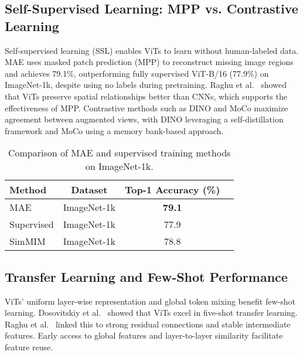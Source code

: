 \documentclass[conference]{IEEEtran}
\begin{document}
\subsection{Self-Supervised Learning: MPP vs. Contrastive Learning}

Self-supervised learning (SSL) enables ViTs to learn without human-labeled data. MAE \cite{he2022masked} uses masked patch prediction (MPP) to reconstruct missing image regions and achieves 79.1\%, outperforming fully supervised ViT-B/16 (77.9\%) on ImageNet-1k, despite using no labels during pretraining. Raghu et al.~\cite{raghu2021vision} showed that ViTs preserve spatial relationships better than CNNs, which supports the effectiveness of MPP. Contrastive methods such as DINO and MoCo \cite{caron2021emerging, chen2021empirical} maximize agreement between augmented views, with DINO leveraging a self-distillation framework and MoCo using a memory bank-based approach.

\begin{table}[ht]
    \centering
    \caption{Comparison of MAE and supervised training methods on ImageNet-1k.}
    \begin{tabular}{lccc}
        \hline
        \textbf{Method} & \textbf{Dataset} & \textbf{Top-1 Accuracy (\%)} \\ \hline
        MAE             & ImageNet-1k      & \textbf{79.1}                \\
        Supervised      & ImageNet-1k      & 77.9                         \\
        SimMIM          & ImageNet-1k      & 78.8                         \\ \hline
    \end{tabular}
\end{table}

\subsection{Transfer Learning and Few-Shot Performance}

ViTs' uniform layer-wise representation and global token mixing benefit few-shot learning. Dosovitskiy et al.~\cite{dosovitskiy2021an} showed that ViTs excel in five-shot transfer learning. Raghu et al.~\cite{raghu2021vision} linked this to strong residual connections and stable intermediate features. Early access to global features and layer-to-layer similarity facilitate feature reuse.
\end{document}
